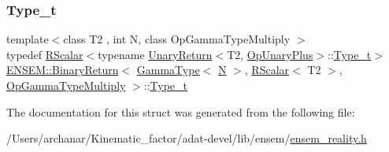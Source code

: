 \subsubsection{\texorpdfstring{Type\_t}{Type\_t}\hspace{0.1cm}{\footnotesize\ttfamily [3/3]}}
{\footnotesize\ttfamily template$<$class T2 , int N, class Op\+Gamma\+Type\+Multiply $>$ \\
typedef \mbox{\hyperlink{classENSEM_1_1RScalar}{R\+Scalar}}$<$typename \mbox{\hyperlink{structENSEM_1_1UnaryReturn}{Unary\+Return}}$<$T2, \mbox{\hyperlink{structENSEM_1_1OpUnaryPlus}{Op\+Unary\+Plus}}$>$\+::\mbox{\hyperlink{structENSEM_1_1BinaryReturn_3_01GammaType_3_01N_01_4_00_01RScalar_3_01T2_01_4_00_01OpGammaTypeMultiply_01_4_a943d82dee1746ec497924dece721a7d7}{Type\+\_\+t}}$>$ \mbox{\hyperlink{structENSEM_1_1BinaryReturn}{E\+N\+S\+E\+M\+::\+Binary\+Return}}$<$ \mbox{\hyperlink{classENSEM_1_1GammaType}{Gamma\+Type}}$<$ \mbox{\hyperlink{adat__devel_2lib_2hadron_2operator__name__util_8cc_a7722c8ecbb62d99aee7ce68b1752f337}{N}} $>$, \mbox{\hyperlink{classENSEM_1_1RScalar}{R\+Scalar}}$<$ T2 $>$, \mbox{\hyperlink{structENSEM_1_1OpGammaTypeMultiply}{Op\+Gamma\+Type\+Multiply}} $>$\+::\mbox{\hyperlink{structENSEM_1_1BinaryReturn_3_01GammaType_3_01N_01_4_00_01RScalar_3_01T2_01_4_00_01OpGammaTypeMultiply_01_4_a943d82dee1746ec497924dece721a7d7}{Type\+\_\+t}}}



The documentation for this struct was generated from the following file\+:\begin{DoxyCompactItemize}
\item 
/\+Users/archanar/\+Kinematic\+\_\+factor/adat-\/devel/lib/ensem/\mbox{\hyperlink{adat-devel_2lib_2ensem_2ensem__reality_8h}{ensem\+\_\+reality.\+h}}\end{DoxyCompactItemize}
